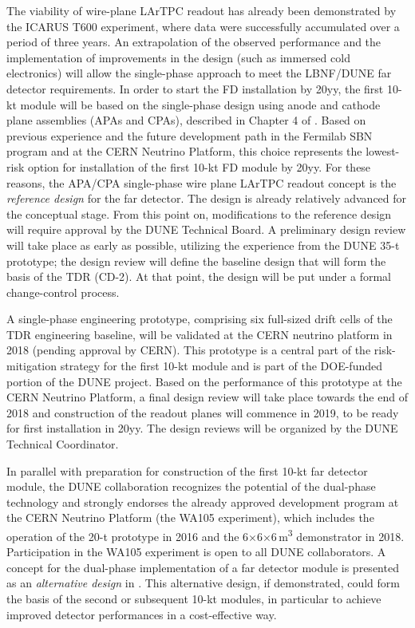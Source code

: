 The viability of wire-plane LArTPC readout has already been demonstrated by the ICARUS T600 
experiment, where data were successfully accumulated over a period of three years. 
An extrapolation of the observed performance and the implementation of improvements 
in the design (such as immersed cold electronics) will allow the single-phase 
approach to meet the LBNF/DUNE far detector requirements. In order to start the FD installation
by 20yy, %
the first 10-kt module will be based on the single-phase design using anode and cathode
plane assemblies (APAs and CPAs), described in Chapter 4 of \voldune. 
Based on previous experience and the 
future development path in the Fermilab SBN program and at the CERN Neutrino Platform, 
this choice represents the lowest-risk option for installation of the first 10-kt FD module by 
20yy. %
For these reasons, the APA/CPA single-phase wire plane LArTPC readout 
concept %
is the \textit{reference design} 
for the far detector. 
The design is already relatively advanced for the conceptual  
stage. From this point on, modifications to the reference design will require approval
by the DUNE Technical Board. A preliminary design review will take place as early 
as possible, utilizing the experience from the DUNE 35-t prototype; the design 
review will define the baseline design that will form the basis of the TDR (CD-2). 
At that point, the design will be put under a formal change-control 
process. 

A single-phase engineering prototype,
comprising six full-sized drift cells of the TDR engineering baseline,
will be validated at the CERN neutrino platform in 2018 (pending approval by CERN). 
This %
prototype is a central part of the risk-mitigation 
strategy for the first 10-kt module and is part of the DOE-funded portion of the DUNE project. 
Based on the  performance of this prototype at the CERN Neutrino Platform, a final design review will 
take place towards the end of 2018 and construction of the readout planes will 
commence in 2019, to be ready for first installation in 20yy. %
The design reviews 
will be organized by the DUNE Technical Coordinator. 

In parallel with preparation for construction of the first 10-kt far detector module, 
the DUNE collaboration recognizes the potential of the dual-phase technology and 
strongly endorses the already approved development program at the CERN Neutrino 
Platform (the WA105 experiment), which includes the operation of the 20-t prototype 
in 2016 and the 6$\times$6$\times$6\,m\textsuperscript{3} demonstrator in 2018. Participation 
in the WA105 experiment is open to all DUNE collaborators. A concept for the dual-phase 
implementation of a far detector module is presented as an \textit{alternative 
design} in \voldune. This alternative design, if demonstrated, 
could form the basis of the second or subsequent 10-kt modules, in 
particular to achieve improved detector performances in a cost-effective way. 

